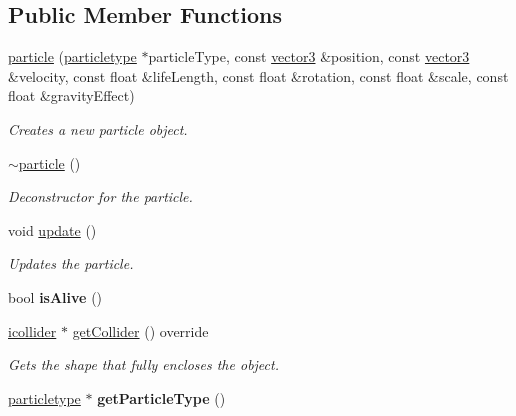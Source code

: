 \subsection*{Public Member Functions}
\begin{DoxyCompactItemize}
\item 
\hyperlink{classflounder_1_1particle_a031b89de2f5f74b55cc97209229eaccd}{particle} (\hyperlink{classflounder_1_1particletype}{particletype} $\ast$particle\+Type, const \hyperlink{classflounder_1_1vector3}{vector3} \&position, const \hyperlink{classflounder_1_1vector3}{vector3} \&velocity, const float \&life\+Length, const float \&rotation, const float \&scale, const float \&gravity\+Effect)
\begin{DoxyCompactList}\small\item\em Creates a new particle object. \end{DoxyCompactList}\item 
\hyperlink{classflounder_1_1particle_a156e09a44b655e9d64d90302852ae144}{$\sim$particle} ()
\begin{DoxyCompactList}\small\item\em Deconstructor for the particle. \end{DoxyCompactList}\item 
void \hyperlink{classflounder_1_1particle_ad524600c5aa2c2594896cf8702187e7e}{update} ()
\begin{DoxyCompactList}\small\item\em Updates the particle. \end{DoxyCompactList}\item 
\mbox{\label{classflounder_1_1particle_accf9e8afa49a6b0406256e09403106f0}} 
bool {\bfseries is\+Alive} ()
\item 
\hyperlink{classflounder_1_1icollider}{icollider} $\ast$ \hyperlink{classflounder_1_1particle_a158ec50298e711488720eaf36600f828}{get\+Collider} () override
\begin{DoxyCompactList}\small\item\em Gets the shape that fully encloses the object. \end{DoxyCompactList}\item 
\mbox{\label{classflounder_1_1particle_a29749320a78b2f8d77d07eb4c0515d10}} 
\hyperlink{classflounder_1_1particletype}{particletype} $\ast$ {\bfseries get\+Particle\+Type} ()
\item 
\mbox{\label{classflounder_1_1particle_a4996acf5600d61e557afdf85a84c90b5}} 

\end{DoxyCompactItemize}
